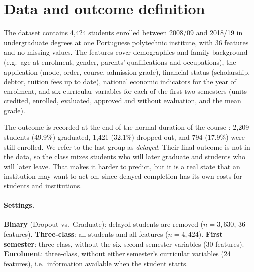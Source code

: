 \documentclass[11pt,a4paper]{article}
\begin{document}
\section{Data and outcome definition}
\label{sec:data}

The dataset \citep{realinho2021uci} contains 4{,}424 students enrolled between 2008/09 and 2018/19 in undergraduate degrees at one Portuguese polytechnic institute, with 36 features and no missing values. The features cover demographics and family background (e.g.\ age at enrolment, gender, parents' qualifications and occupations), the application (mode, order, course, admission grade), financial status (scholarship, debtor, tuition fees up to date), national economic indicators for the year of enrolment, and six curricular variables for each of the first two semesters (units credited, enrolled, evaluated, approved and without evaluation, and the mean grade).

The outcome is recorded at the end of the normal duration of the course \citep{realinho2022}: 2{,}209 students (49.9\%) graduated, 1{,}421 (32.1\%) dropped out, and 794 (17.9\%) were still enrolled. We refer to the last group as \emph{delayed}. Their final outcome is not in the data, so the class mixes students who will later graduate and students who will later leave. That makes it harder to predict, but it is a real state that an institution may want to act on, since delayed completion has its own costs for students and institutions.

\paragraph{Settings.}
\textbf{Binary} (Dropout vs.\ Graduate): delayed students are removed ($n=3{,}630$, 36 features).
\textbf{Three-class}: all students and all features ($n=4{,}424$).
\textbf{First semester}: three-class, without the six second-semester variables (30 features).
\textbf{Enrolment}: three-class, without either semester's curricular variables (24 features), i.e.\ information available when the student starts.
\end{document}
